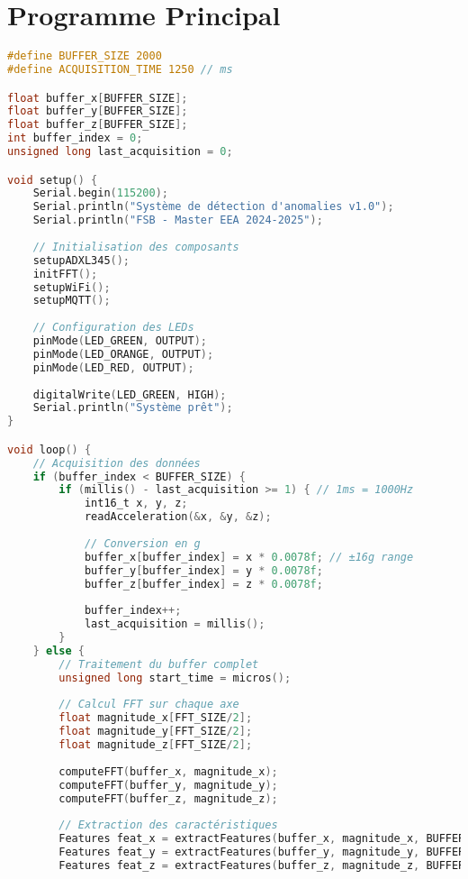 \section{Programme Principal}

\begin{lstlisting}[language=C, caption=Boucle principale du système]
#define BUFFER_SIZE 2000
#define ACQUISITION_TIME 1250 // ms

float buffer_x[BUFFER_SIZE];
float buffer_y[BUFFER_SIZE];
float buffer_z[BUFFER_SIZE];
int buffer_index = 0;
unsigned long last_acquisition = 0;

void setup() {
    Serial.begin(115200);
    Serial.println("Système de détection d'anomalies v1.0");
    Serial.println("FSB - Master EEA 2024-2025");
    
    // Initialisation des composants
    setupADXL345();
    initFFT();
    setupWiFi();
    setupMQTT();
    
    // Configuration des LEDs
    pinMode(LED_GREEN, OUTPUT);
    pinMode(LED_ORANGE, OUTPUT);
    pinMode(LED_RED, OUTPUT);
    
    digitalWrite(LED_GREEN, HIGH);
    Serial.println("Système prêt");
}

void loop() {
    // Acquisition des données
    if (buffer_index < BUFFER_SIZE) {
        if (millis() - last_acquisition >= 1) { // 1ms = 1000Hz
            int16_t x, y, z;
            readAcceleration(&x, &y, &z);
            
            // Conversion en g
            buffer_x[buffer_index] = x * 0.0078f; // ±16g range
            buffer_y[buffer_index] = y * 0.0078f;
            buffer_z[buffer_index] = z * 0.0078f;
            
            buffer_index++;
            last_acquisition = millis();
        }
    } else {
        // Traitement du buffer complet
        unsigned long start_time = micros();
        
        // Calcul FFT sur chaque axe
        float magnitude_x[FFT_SIZE/2];
        float magnitude_y[FFT_SIZE/2];
        float magnitude_z[FFT_SIZE/2];
        
        computeFFT(buffer_x, magnitude_x);
        computeFFT(buffer_y, magnitude_y);
        computeFFT(buffer_z, magnitude_z);
        
        // Extraction des caractéristiques
        Features feat_x = extractFeatures(buffer_x, magnitude_x, BUFFER_SIZE);
        Features feat_y = extractFeatures(buffer_y, magnitude_y, BUFFER_SIZE);
        Features feat_z = extractFeatures(buffer_z, magnitude_z, BUFFER_SIZE);
        

\end{lstlisting}

